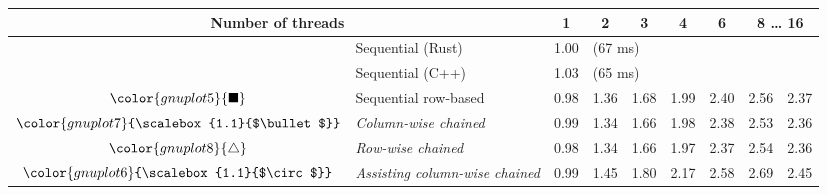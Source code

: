\begin{tabular}{clrrrrrrr}
\toprule
\multicolumn{2}{c}{\textbf{Number of threads}} & \multicolumn{1}{c}{\textbf{ 1 }} & \multicolumn{1}{c}{\textbf{ 2 }} & \multicolumn{1}{c}{\textbf{ 3 }} & \multicolumn{1}{c}{\textbf{ 4 }} & \multicolumn{1}{c}{\textbf{ 6 }} & \multicolumn{2}{c}{\textbf{ 8 } \dots \textbf{ 16 }} \\
\midrule
& Sequential (Rust) & \multicolumn{1}{r}{ 1.00 } & \multicolumn{ 6 }{l}{(67 ms)} \\
& Sequential (C++) & \multicolumn{1}{r}{ 1.03 } & \multicolumn{ 6 }{l}{(65 ms)} \\
\rowcolor{gnuplot5!10}$\color{gnuplot5}{\blacksquare}$ & Sequential row-based & \cellcolor{gnuplot5!10} 0.98 & \cellcolor{gnuplot5!10} 1.36 & \cellcolor{gnuplot5!10} 1.68 & \cellcolor{gnuplot5!10} 1.99 & \cellcolor{gnuplot5!10} 2.40 & \cellcolor{gnuplot5!10} 2.56 & \cellcolor{gnuplot5!10} 2.37 \\
\rowcolor{gnuplot7!30}$\color{gnuplot7}{\scalebox{1.1}{$\bullet$}}$ & \textit{Column-wise chained} & \cellcolor{gnuplot7!30} 0.99 & \cellcolor{gnuplot7!30} 1.34 & \cellcolor{gnuplot7!30} 1.66 & \cellcolor{gnuplot7!30} 1.98 & \cellcolor{gnuplot7!30} 2.38 & \cellcolor{gnuplot7!30} 2.53 & \cellcolor{gnuplot7!30} 2.36 \\
\rowcolor{gnuplot8!30}$\color{gnuplot8}{\triangle}$ & \textit{Row-wise chained} & \cellcolor{gnuplot8!30} 0.98 & \cellcolor{gnuplot8!30} 1.34 & \cellcolor{gnuplot8!30} 1.66 & \cellcolor{gnuplot8!30} 1.97 & \cellcolor{gnuplot8!30} 2.37 & \cellcolor{gnuplot8!30} 2.54 & \cellcolor{gnuplot8!30} 2.36 \\
\rowcolor{gnuplot6!30}$\color{gnuplot6}{\scalebox{1.1}{$\circ$}}$ & \textit{Assisting column-wise chained} & \cellcolor{gnuplot6!30} 0.99 & \cellcolor{gnuplot6!30} 1.45 & \cellcolor{gnuplot6!30} 1.80 & \cellcolor{gnuplot6!30} 2.17 & \cellcolor{gnuplot6!30} 2.58 & \cellcolor{gnuplot6!30} 2.69 & \cellcolor{gnuplot6!30} 2.45 \\
\bottomrule
\end{tabular}
